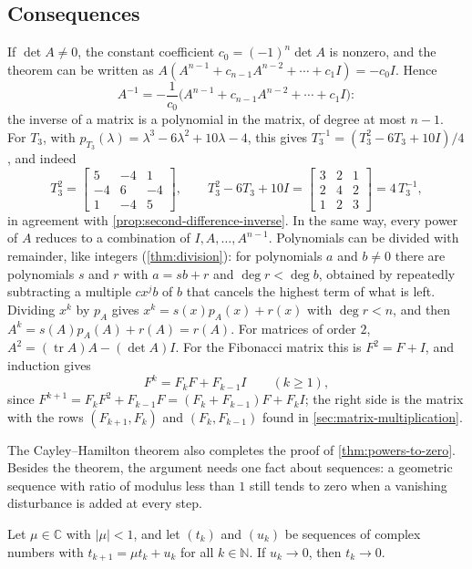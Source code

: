 \subsection{Consequences}

If $\det A\ne0$, the constant coefficient $c_0=(-1)^n\det A$ is nonzero, and the theorem can be written as $A(A^{n-1}+c_{n-1}A^{n-2}+\cdots+c_1I)=-c_0I$. Hence
\[
A^{-1}=-\frac1{c_0}\bigl(A^{n-1}+c_{n-1}A^{n-2}+\cdots+c_1I\bigr):
\]
the inverse of a matrix is a polynomial in the matrix, of degree at most $n-1$. For $T_3$, with $p_{T_3}(\lambda)=\lambda^3-6\lambda^2+10\lambda-4$, this gives $T_3^{-1}=(T_3^2-6T_3+10I)/4$, and indeed
\[
T_3^2=\begin{bmatrix}5&-4&1\\-4&6&-4\\1&-4&5\end{bmatrix},\qquad T_3^2-6T_3+10I=\begin{bmatrix}3&2&1\\2&4&2\\1&2&3\end{bmatrix}=4\,T_3^{-1},
\]
in agreement with \cref{prop:second-difference-inverse}. In the same way, every power of $A$ reduces to a combination of $I,A,\ldots,A^{n-1}$. Polynomials can be divided with remainder, like integers (\cref{thm:division}): for polynomials $a$ and $b\ne0$ there are polynomials $s$ and $r$ with $a=sb+r$ and $\deg r<\deg b$, obtained by repeatedly subtracting a multiple $cx^jb$ of $b$ that cancels the highest term of what is left. Dividing $x^k$ by $p_A$ gives $x^k=s(x)p_A(x)+r(x)$ with $\deg r<n$, and then $A^k=s(A)p_A(A)+r(A)=r(A)$. For matrices of order $2$, $A^2=(\operatorname{tr}A)A-(\det A)I$. For the Fibonacci matrix this is $F^2=F+I$, and induction gives
\[
F^k=F_kF+F_{k-1}I\qquad(k\ge1),
\]
since $F^{k+1}=F_kF^2+F_{k-1}F=(F_k+F_{k-1})F+F_kI$; the right side is the matrix with the rows $(F_{k+1},F_k)$ and $(F_k,F_{k-1})$ found in \cref{sec:matrix-multiplication}.

The Cayley--Hamilton theorem also completes the proof of \cref{thm:powers-to-zero}. Besides the theorem, the argument needs one fact about sequences: a geometric sequence with ratio of modulus less than $1$ still tends to zero when a vanishing disturbance is added at every step.

\begin{lemma}
\label{lem:disturbed-geometric}
Let $\mu\in\mathbb C$ with $|\mu|<1$, and let $(t_k)$ and $(u_k)$ be sequences of complex numbers with $t_{k+1}=\mu t_k+u_k$ for all $k\in\mathbb N$. If $u_k\to0$, then $t_k\to0$.
\end{lemma}

